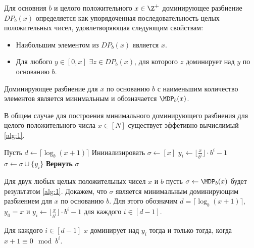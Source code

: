 \begin{definition}
	Для основния $b$ и целого положительного $x \in \Z^+$ доминирующее разбиение $DP_b(x)$ определяется как упорядоченная последовательность целых положительных чисел, удовлетворяющая следующим свойствам:
	\begin{itemize}
		\item Наибольшим элементом из $DP_b(x)$ является $x$.
		\item Для любого $y \in [0, x]$ $\exists z \in DP_b(x)$, для которого $z$ доминирует над $y$ по основанию $b$.
	\end{itemize}
\end{definition}

\begin{definition}
	Доминирующее разбиение для $x$ по основанию $b$ с наименьшим количество элементов является минимальным и обозначается $\MDP_b(x)$.
\end{definition}


В общем случае для построения минимального доминирующего разбиения для целого положительного числа $x \in [N]$ существует эффетивно вычислимый \ref{alg:1}.

\begin{algorithm}
    \caption{Вычисление $\MDP_b(x)$}
    \label{alg:1}
    \begin{algorithmic}
        \STATE Пусть $d \leftarrow \lceil \log_b(x+1) \rceil$
        \STATE Инииализировать $\sigma \leftarrow [x]$
                \STATE $y_i \leftarrow \lfloor \frac{x}{b^i} \rfloor \cdot b^i - 1$
                \STATE $\sigma \leftarrow \sigma \cup \{y_i\}$
            \ENDIF
        \ENDFOR
        \STATE \textbf{Вернуть} $\sigma$
    \end{algorithmic}
\end{algorithm}

Для двух любых целых положительных чисел $x$ и $b$ пусть $\sigma \leftarrow \MDP_b(x)$ будет результатом \ref{alg:1}.
Докажем, что $\sigma$ является минимальным доминирующим разбиением для $x$ по основанию $b$.
Для этого обозначим $d = \lceil \log_b(x + 1) \rceil$, $y_0 = x$ и $y_i \leftarrow \lfloor \frac{x}{b^i} \rfloor \cdot b^i - 1$ для каждого $i \in [d - 1]$.

\begin{theorem}
	\label{lemma:1}
	Для каждого $i \in [d - 1]$ $x$ доминирует над $y_i$ тогда и только тогда, когда $x + 1 \equiv 0 \mod b^i$.
\end{theorem}

